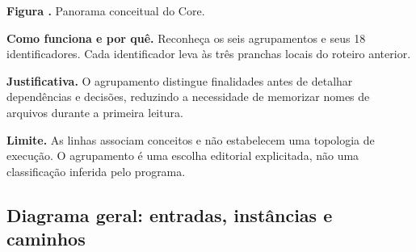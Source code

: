 \noindent\textbf{Figura \thefigure.} Panorama conceitual do Core.\par

\noindent\textbf{Como funciona e por quê.} Reconheça os seis agrupamentos e seus 18 identificadores. Cada identificador leva às três pranchas locais do roteiro anterior.\par

\noindent\textbf{Justificativa.} O agrupamento distingue finalidades antes de detalhar dependências e decisões, reduzindo a necessidade de memorizar nomes de arquivos durante a primeira leitura.\par

\noindent\textbf{Limite.} As linhas associam conceitos e não estabelecem uma topologia de execução. O agrupamento é uma escolha editorial explicitada, não uma classificação inferida pelo programa.\par

\clearpage{}\label{fig:global-processes}

\subsection*{Diagrama geral: entradas, instâncias e caminhos}

